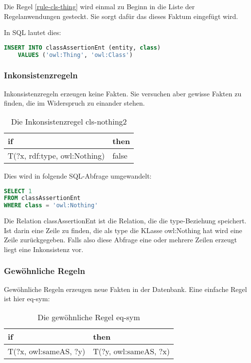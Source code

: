 Die Regel \ref{rule-cls-thing} wird einmal zu Beginn in die Liste der Regelanwendungen gesteckt. Sie sorgt dafür das dieses Faktum eingefügt wird.

In SQL lautet dies:
\begin{lstlisting}[language=SQL]
INSERT INTO classAssertionEnt (entity, class)
	VALUES ('owl:Thing', 'owl:Class')
\end{lstlisting}

\subsubsection{Inkonsistenzregeln}
Inkonsistenzregeln erzeugen keine Fakten. Sie versuchen aber gewisse Fakten zu finden, die im Widerspruch zu einander stehen.

\begin{table}[htb]
\begin{center}
	\begin{tabular}{l|l}
	if & then \\ \hline
	T(?x, rdf:type, owl:Nothing) & false
	\end{tabular}
\end{center}
	\caption{Die Inkonsistenzregel cls-nothing2}
	\label{rule-cls-nothing2}
\end{table}


Dies wird in folgende SQL-Abfrage umgewandelt:
\begin{lstlisting}[language=SQL]
SELECT 1
FROM classAssertionEnt
WHERE class = 'owl:Nothing'
\end{lstlisting}

Die Relation classAssertionEnt ist die Relation, die die type-Beziehung speichert. Ist darin eine Zeile zu finden, die als type die KLasse owl:Nothing hat wird eine Zeile zurückgegeben. Falls also diese Abfrage eine oder mehrere Zeilen erzeugt liegt eine Inkonsistenz vor.

\subsubsection{Gewöhnliche Regeln}
Gewöhnliche Regeln erzeugen neue Fakten in der Datenbank. Eine einfache Regel ist hier eq-sym:

\begin{table}[htb]
\begin{center}
	\begin{tabular}{l|l}
	if & then \\ \hline
	T(?x, owl:sameAS, ?y) & T(?y, owl:sameAS, ?x)
	\end{tabular}
\end{center}
	\caption{Die gewöhnliche Regel eq-sym}
	\label{rule-eq-sym}
\end{table}

